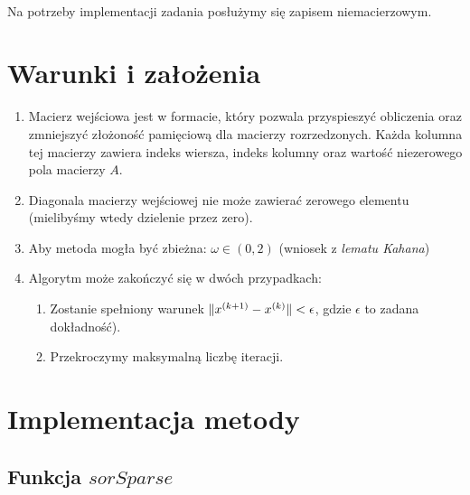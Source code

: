 \documentclass{article}
\DeclarePairedDelimiter{\norm}{\lVert}{\rVert}
\begin{document}
\paragraph{}
Na potrzeby implementacji zadania posłużymy się zapisem niemacierzowym.

\section{Warunki i założenia}
\begin{enumerate}
\item Macierz wejściowa jest w formacie, który pozwala przyspieszyć obliczenia oraz zmniejszyć złożoność pamięciową dla macierzy rozrzedzonych. Każda kolumna tej macierzy zawiera indeks wiersza, indeks kolumny oraz wartość niezerowego pola macierzy $A$.
\item Diagonala macierzy wejściowej nie może zawierać zerowego elementu (mielibyśmy wtedy dzielenie przez zero). 
\item Aby metoda mogła być zbieżna: $\omega \in (0,2)$ (wniosek z \textit{lematu Kahana})
\item Algorytm może zakończyć się w dwóch przypadkach:
\begin {enumerate}
\item Zostanie spełniony warunek $\norm{x^{(k+1)}-x^{(k)}}<\epsilon$, gdzie $\epsilon$ to zadana\\ dokładność).
\item Przekroczymy maksymalną liczbę iteracji.
\end {enumerate}
\end{enumerate}

\section{Implementacja metody}
\subsection{Funkcja $sorSparse$}
\end{document}
